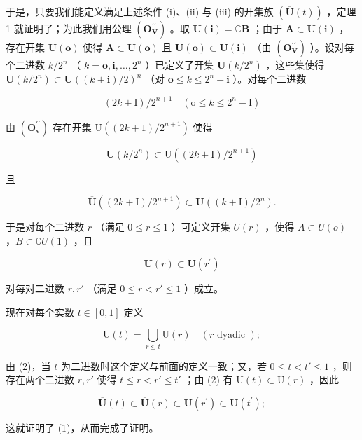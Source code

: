 于是，只要我们能定义满足上述条件 (i)、(ii) 与 (iii) 的开集族 \((\overline{\mathbf{U}}(t))\) ，定理 1 就证明了；为此我们用公理 \((\mathbf{O}_{\mathbf{V}}^{\prime \prime})\) 。取 \(\mathbf{U}(\mathbf{i}) = \mathbb{C}\mathbf{B}\) ；由于 \(\mathbf{A} \subset \mathbf{U}(\mathbf{i})\) ，存在开集 \(\mathbf{U}(\mathbf{o})\) 使得 \(\mathbf{A} \subset \mathbf{U}(\mathbf{o})\) 且 \(\mathbf{U}(\mathbf{o}) \subset \mathbf{U}(\mathbf{i})\) （由 \((\mathbf{O}_{\mathbf{V}}^{\prime \prime})\) ）。设对每个二进数 \(k / 2^n\) （ \(k = \mathbf{o}, \mathbf{i}, \ldots, 2^n\) ）已定义了开集 \(\mathbf{U}(k / 2^n)\) ，这些集使得 \(\overline{\mathbf{U}}(k / 2^n) \subset \mathbf{U}((k + \mathbf{i}) / 2)^n\) （对 \(\mathbf{o} \leqslant k \leqslant 2^n - \mathbf{i}\) ）。对每个二进数

\[
(2 k + \mathrm{I}) / 2 ^ {n + 1} \quad (\mathrm{o} \leqslant k \leqslant 2 ^ {n} - \mathrm{I})
\]

由 \((\mathbf{O}_{\mathbf{v}}^{\prime \prime})\) 存在开集 \(\mathrm{U}((2k + 1) / 2^{n + 1})\) 使得

\[
\overline {{{{\mathbf {U}}}}} (k / 2 ^ {n}) \subset \mathrm{U} ((2 k + \mathrm{I}) / 2 ^ {n + 1})
\]

且

\[
\overline {{{\mathbf {U}}}} ((2 k + \mathrm{I}) / 2 ^ {n + 1}) \subset \mathbf {U} ((k + \mathrm{I}) / 2 ^ {n}).
\]

于是对每个二进数 \(r\) （满足 \(0 \leqslant r \leqslant 1\) ）可定义开集 \(U(r)\) ，使得 \(A \subset U(o)\) ，\(B \subset \complement U(1)\) ，且

\[
\overline {{{\mathbf {U}}}} (r) \subset \mathbf {U} (r ^ {\prime})\tag{2}
\]

对每对二进数 \(r, r'\) （满足 \(0 \leqslant r < r' \leqslant 1\) ）成立。

现在对每个实数 \(t \in [0, 1]\) 定义

\[
\mathrm{U} (t) = \bigcup_ {r \leqslant t} \mathrm{U} (r) \quad (r \text { dyadic });
\]

由 (2)，当 \(t\) 为二进数时这个定义与前面的定义一致；又，若 \(0 \leqslant t < t' \leqslant 1\) ，则存在两个二进数 \(r, r'\) 使得 \(t \leqslant r < r' \leqslant t'\) ；由 (2) 有 \(\mathrm{U}(t) \subset \mathrm{U}(r)\) ，因此

\[
\overline {{{\mathbf {U}}}} (t) \subset \overline {{{\mathbf {U}}}} (r) \subset \mathbf {U} (r ^ {\prime}) \subset \mathbf {U} (t ^ {\prime});
\]

这就证明了 (1)，从而完成了证明。


